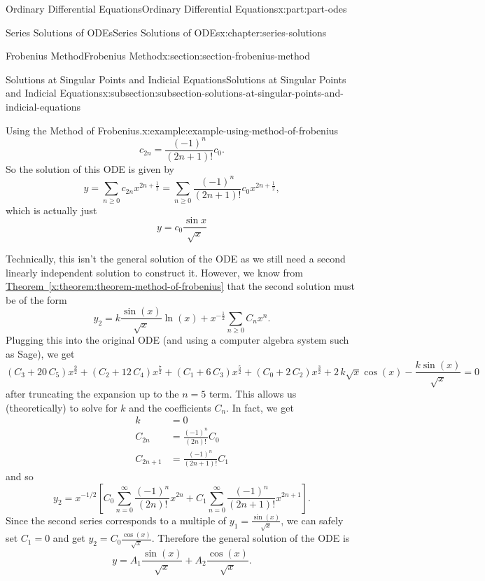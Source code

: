 \documentclass[twoside,10pt,]{book}
\newcommand{\xreffont}{\relax}
\numberwithin{equation}{part}
\newcommand{\amp}{&}
\begin{document}
\begin{partptx}{Ordinary Differential Equations}{}{Ordinary Differential Equations}{}{}{x:part:part-odes}
\begin{chapterptx}{Series Solutions of ODEs}{}{Series Solutions of ODEs}{}{}{x:chapter:series-solutions}
\begin{sectionptx}{Frobenius Method}{}{Frobenius Method}{}{}{x:section:section-frobenius-method}
\begin{subsectionptx}{Solutions at Singular Points and Indicial Equations}{}{Solutions at Singular Points and Indicial Equations}{}{}{x:subsection:subsection-solutions-at-singular-points-and-indicial-equations}
\begin{example}{Using the Method of Frobenius.}{x:example:example-using-method-of-frobenius}
\begin{equation*}
c_{2n} = \frac{(-1)^{n}}{(2n+1)!}c_{0}.
\end{equation*}
So the solution of this ODE is given by%
\begin{equation*}
y = \sum_{n\geq0}c_{2n}x^{2n+\frac{1}{2}} = \sum_{n\geq0}\frac{(-1)^{n}}{(2n+1)!}c_{0}x^{2n+\frac{1}{2}},
\end{equation*}
which is actually just%
\begin{equation*}
y = c_{0}\frac{\sin x}{\sqrt{x}}
\end{equation*}
%
\par
Technically, this isn't the general solution of the ODE as we still need a second linearly independent solution to construct it. However, we know from \hyperref[x:theorem:theorem-method-of-frobenius]{Theorem~{\xreffont\ref{x:theorem:theorem-method-of-frobenius}}} that the second solution must be of the form%
\begin{equation*}
y_2 = k\frac{\sin(x)}{\sqrt{x}}\ln(x) + x^{-\frac{1}{2}}\sum_{n\geq0}C_n x^n.
\end{equation*}
Plugging this into the original ODE (and using a computer algebra system such as Sage), we get%
\begin{equation*}
{\left(C_{3} + 20 \, C_{5}\right)} x^{\frac{9}{2}} + {\left(C_{2} + 12 \, C_{4}\right)} x^{\frac{7}{2}} + {\left(C_{1} + 6 \, C_{3}\right)} x^{\frac{5}{2}} + {\left(C_{0} + 2 \, C_{2}\right)} x^{\frac{3}{2}} + 2 \, k \sqrt{x} \cos\left(x\right) - \frac{k \sin\left(x\right)}{\sqrt{x}} = 0
\end{equation*}
after truncating the expansion up to the \(n=5\) term. This allows us (theoretically) to solve for \(k\) and the coefficients \(C_n\). In fact, we get%
\begin{align*}
k \amp= 0\\
C_{2n} \amp= \frac{(-1)^n}{(2n)!}C_0\\
C_{2n+1} \amp= \frac{(-1)^n}{(2n+1)!}C_1
\end{align*}
and so%
\begin{equation*}
y_2 = x^{-1/2}\left[C_0\sum_{n=0}^{\infty}\frac{(-1)^n}{(2n)!}x^{2n} + C_1 \sum_{n=0}^{\infty}\frac{(-1)^n}{(2n+1)!}x^{2n+1}\right].
\end{equation*}
Since the second series corresponds to a multiple of \(y_1 = \frac{\sin(x)}{\sqrt{x}}\), we can safely set \(C_1 = 0\) and get \(y_2 = C_0\frac{\cos(x)}{\sqrt{x}}\). Therefore the general solution of the ODE is%
\begin{equation*}
y = A_1\frac{\sin(x)}{\sqrt{x}} + A_{2}\frac{\cos(x)}{\sqrt{x}}.
\end{equation*}

\end{example}
\end{subsectionptx}
\end{sectionptx}
\end{chapterptx}
\end{partptx}
\end{document}
